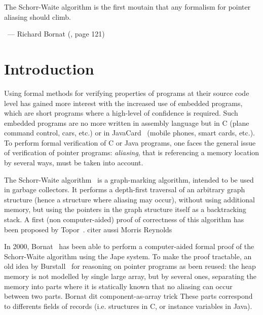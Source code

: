 


\hfill\begin{minipage}{0.5\textwidth}
\begin{slshape}
The Schorr-Waite algorithm is the first moutain that any formalism for
pointer aliasing should climb.
\end{slshape}

~\hfill --- Richard Bornat (\cite{bornat00mpc}, page 121)
\end{minipage}

\section{Introduction}

Using formal methods for verifying properties of programs at their
source code level has gained more interest with the increased use of
embedded programs, which are short programs where a high-level of
confidence is required. Such embedded programs are no more written in
assembly language but in C (plane command control, cars, etc.) or in
JavaCard~\cite{JavaCard} (mobile phones, smart cards, etc.).  To
perform formal verification of C or Java programs, one faces the
general issue of verification of pointer programs: \emph{aliasing},
that is referencing a memory location by several ways, must be taken
into account. 

The Schorr-Waite algorithm~\cite{schorr67cacm} is a graph-marking
algorithm, intended to be used in garbage collectors. It performs a
depth-first traversal of an arbitrary graph structure (hence a
structure where aliasing may occur), without using additional memory,
but using the pointers in the graph structure itself as a backtracking
stack. A first (non computer-aided) proof of correctness of this
algorithm has been proposed by Topor~\cite{topor79acta}. {\huge citer
  aussi Morris \cite{morris82} Reynolds }

In 2000, Bornat~\cite{bornat00mpc} has been able to perform a
computer-aided formal proof of the Schorr-Waite algorithm using the
Jape system. To make the proof tractable, an old idea by
Burstall~\cite{burstall72} for reasoning on pointer programs as been
reused: the heap memory is not modelled by single large array, but by
several ones, separating the memory into parts where it is statically
known that no aliasing can occur between two parts. {\huge Bornat dit
  component-as-array trick} These parts correspond to differents
fields of records (i.e. structures in C, or instance variables in
Java).

